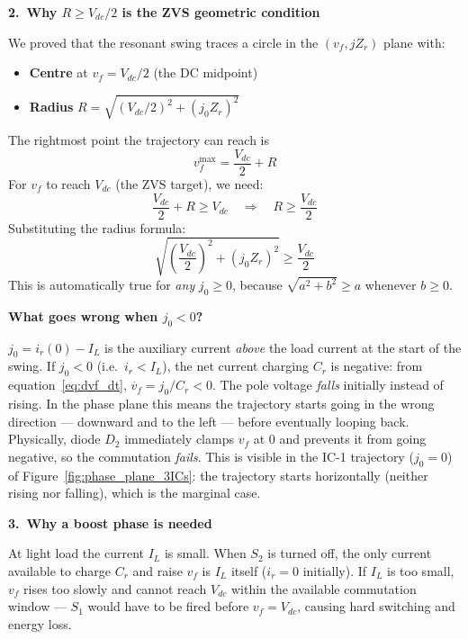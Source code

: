 \documentclass[12pt, a4paper]{article}
\def\,{ }%
\newcommand{\Vdc}{V_{dc}}
\newcommand{\vf}{v_f}
\newcommand{\ir}{i_r}
\newcommand{\IL}{I_L}
\newcommand{\Cr}{C_r}
\newcommand{\Zr}{Z_r}
\begin{document}
\begin{physbox}
\medskip
\textbf{2.\ Why $R \geq \Vdc/2$ is the ZVS geometric condition}

We proved that the resonant swing traces a circle in the
$(\vf,\,j\Zr)$ plane with:
\begin{itemize}
    \item \textbf{Centre} at $\vf = \Vdc/2$ (the DC midpoint)
    \item \textbf{Radius} $R = \sqrt{({\Vdc}/{2})^2 + (j_0\Zr)^2}$
\end{itemize}
The rightmost point the trajectory can reach is
\begin{equation*}
    \vf^\text{max} = \frac{\Vdc}{2} + R
\end{equation*}
For $\vf$ to reach $\Vdc$ (the ZVS target), we need:
\begin{equation*}
    \frac{\Vdc}{2} + R \geq \Vdc
    \quad\Longrightarrow\quad
    R \geq \frac{\Vdc}{2}
\end{equation*}
Substituting the radius formula:
\begin{equation*}
    \sqrt{\left(\frac{\Vdc}{2}\right)^{\!2} + (j_0\Zr)^2} \geq \frac{\Vdc}{2}
\end{equation*}
This is automatically true for \emph{any} $j_0 \geq 0$, because
$\sqrt{a^2 + b^2} \geq a$ whenever $b \geq 0$.

\medskip
\textbf{What goes wrong when $j_0 < 0$?}

$j_0 = \ir(0) - \IL$ is the auxiliary current \emph{above} the load current
at the start of the swing.  If $j_0 < 0$ (i.e.\ $\ir < \IL$), the net current
charging $\Cr$ is negative: from equation~\eqref{eq:dvf_dt},
$\dot{\vf} = j_0/\Cr < 0$.
The pole voltage \emph{falls} initially instead of rising.
In the phase plane this means the trajectory starts going in the wrong
direction — downward and to the left — before eventually looping back.
Physically, diode $D_2$ immediately clamps $\vf$ at 0 and prevents
it from going negative, so the commutation \emph{fails}.
This is visible in the IC-1 trajectory ($j_0=0$) of
Figure~\ref{fig:phase_plane_3ICs}: the trajectory starts horizontally
(neither rising nor falling), which is the marginal case.

\medskip
\textbf{3.\ Why a boost phase is needed}

At light load the current $\IL$ is small.
When $S_2$ is turned off, the only current available to charge $\Cr$ and
raise $\vf$ is $\IL$ itself ($\ir = 0$ initially).  If $\IL$ is too small,
$\vf$ rises too slowly and cannot reach $\Vdc$ within the available
commutation window — $S_1$ would have to be fired before $\vf = \Vdc$,
causing hard switching and energy loss.


\end{physbox}
\end{document}
